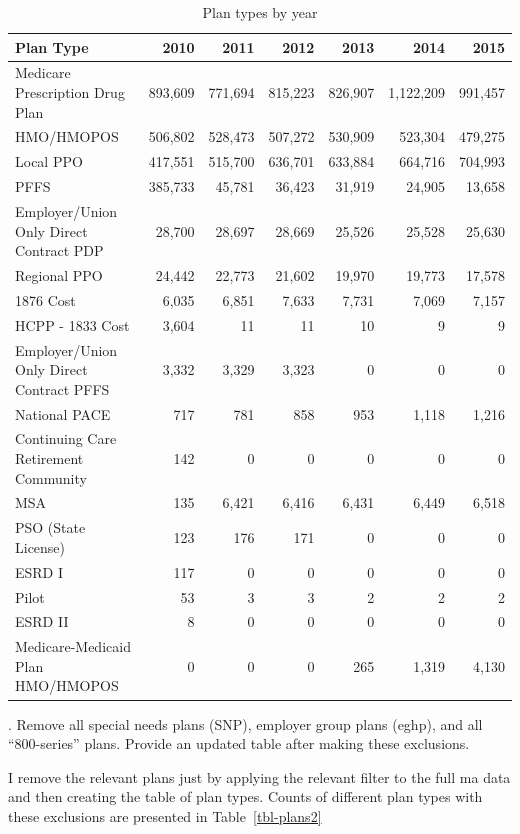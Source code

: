 \documentclass[
  letterpaper,
  DIV=11,
  numbers=noendperiod]{scrartcl}
\begin{document}
\begin{longtable}[t]{lrrrrrr}

\caption{\label{tbl-plans}Plan types by year}

\tabularnewline

\toprule
Plan Type & 2010 & 2011 & 2012 & 2013 & 2014 & 2015\\
\midrule
Medicare Prescription Drug Plan & 893,609 & 771,694 & 815,223 & 826,907 & 1,122,209 & 991,457\\
HMO/HMOPOS & 506,802 & 528,473 & 507,272 & 530,909 & 523,304 & 479,275\\
Local PPO & 417,551 & 515,700 & 636,701 & 633,884 & 664,716 & 704,993\\
PFFS & 385,733 & 45,781 & 36,423 & 31,919 & 24,905 & 13,658\\
Employer/Union Only Direct Contract PDP & 28,700 & 28,697 & 28,669 & 25,526 & 25,528 & 25,630\\
\addlinespace
Regional PPO & 24,442 & 22,773 & 21,602 & 19,970 & 19,773 & 17,578\\
1876 Cost & 6,035 & 6,851 & 7,633 & 7,731 & 7,069 & 7,157\\
HCPP - 1833 Cost & 3,604 & 11 & 11 & 10 & 9 & 9\\
Employer/Union Only Direct Contract PFFS & 3,332 & 3,329 & 3,323 & 0 & 0 & 0\\
National PACE & 717 & 781 & 858 & 953 & 1,118 & 1,216\\
\addlinespace
Continuing Care Retirement Community & 142 & 0 & 0 & 0 & 0 & 0\\
MSA & 135 & 6,421 & 6,416 & 6,431 & 6,449 & 6,518\\
PSO (State License) & 123 & 176 & 171 & 0 & 0 & 0\\
ESRD I & 117 & 0 & 0 & 0 & 0 & 0\\
Pilot & 53 & 3 & 3 & 2 & 2 & 2\\
\addlinespace
ESRD II & 8 & 0 & 0 & 0 & 0 & 0\\
Medicare-Medicaid Plan HMO/HMOPOS & 0 & 0 & 0 & 265 & 1,319 & 4,130\\
\bottomrule

\end{longtable}

\newpage

. Remove all special needs plans (SNP), employer group plans
(eghp), and all ``800-series'' plans. Provide an updated table after
making these exclusions.

I remove the relevant plans just by applying the relevant filter to the
full ma data and then creating the table of plan types. Counts of
different plan types with these exclusions are presented in
Table~\ref{tbl-plans2}
\end{document}
